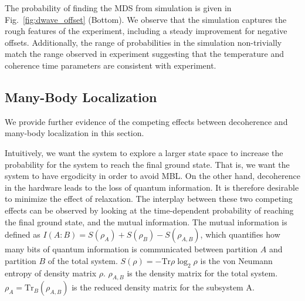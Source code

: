 \documentclass[prd,twocolumn,tightenlines,preprintnumbers,showpacs,superscriptaddress,notitlepage,nofootinbib,eqsecnum,floatfix,longbibliography]{revtex4}
\begin{document}
The probability of finding the MDS from simulation is given in Fig.~\ref{fig:dwave_offset} (Bottom). We observe that the simulation captures the rough features of the experiment, including a steady improvement for negative offsets. Additionally, the range of probabilities in the simulation non-trivially match the range observed in experiment suggesting that the temperature and coherence time parameters are consistent with experiment.

\subsection{Many-Body Localization}

We provide further evidence of the competing effects between decoherence and many-body localization in this section.

Intuitively, we want the system to explore a larger state space to increase the probability for the system to reach the final ground state. That is, we want the system to have ergodicity in order to avoid MBL. On the other hand, decoherence in the hardware leads to the loss of quantum information. It is therefore desirable to minimize the effect of relaxation. The interplay between these two competing effects can be observed by looking at the time-dependent probability of reaching the final ground state, and the mutual information. The mutual information is defined as $I(A:B)=S(\rho_A)+S(\rho_B)-S(\rho_{A,B})$, which quantifies how many bits of quantum information is communicated between partition $A$ and partition $B$ of the total system. $S(\rho)=-\mbox{Tr}\rho \log_2 \rho$ is the von Neumann entropy of density matrix $\rho$. {\color{blue} $\rho_{A,B}$ is the density matrix for the total system. $\rho_{A}=\mbox{Tr}_{B} (\rho_{A,B})$ is the reduced density matrix for the subsystem A.}
\end{document}
